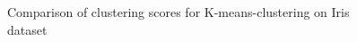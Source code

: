 \begin{figure}[H]
	\qquad
	
	\caption{Comparison of clustering scores for K-means-clustering on Iris dataset}%
\end{figure}

